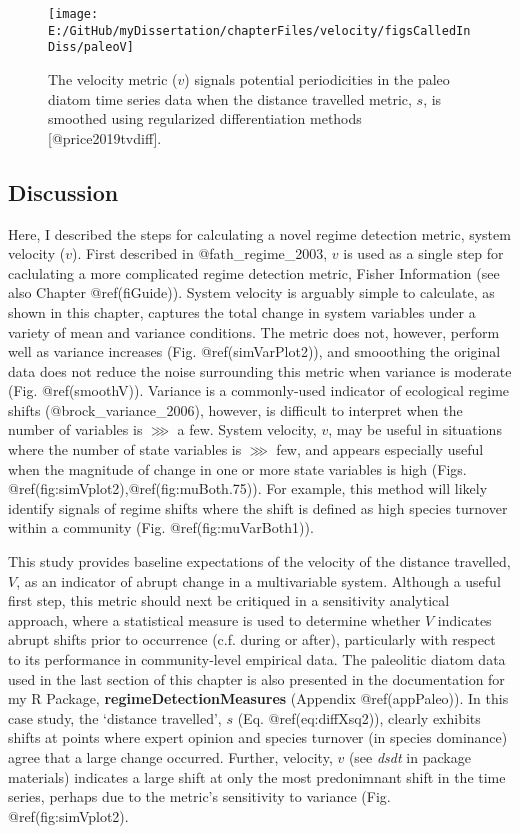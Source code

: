 \documentclass[]{article}
\begin{document}
\begin{figure}

{\centering \texttt{[image: E:/GitHub/myDissertation/chapterFiles/velocity/figsCalledInDiss/paleoV]} 

}

\caption{The velocity metric  ($v$) signals potential periodicities in the paleo diatom time series data when the distance travelled metric, $s$, is smoothed using regularized differentiation methods [@price2019tvdiff].}\label{fig:paleoV}
\end{figure}

\hypertarget{discussion}{%
\subsection{Discussion}\label{discussion}}

Here, I described the steps for calculating a novel regime detection
metric, system velocity (\(v\)). First described in @fath\_regime\_2003,
\(v\) is used as a single step for caclulating a more complicated regime
detection metric, Fisher Information (see also Chapter @ref(fiGuide)).
System velocity is arguably simple to calculate, as shown in this
chapter, captures the total change in system variables under a variety
of mean and variance conditions. The metric does not, however, perform
well as variance increases (Fig. @ref(simVarPlot2)), and smooothing the
original data does not reduce the noise surrounding this metric when
variance is moderate (Fig. @ref(smoothV)). Variance is a commonly-used
indicator of ecological regime shifts (@brock\_variance\_2006), however,
is difficult to interpret when the number of variables is \(\ggg\) a
few. System velocity, \(v\), may be useful in situations where the
number of state variables is \(\ggg\) few, and appears especially useful
when the magnitude of change in one or more state variables is high
(Figs. @ref(fig:simVplot2),@ref(fig:muBoth.75)). For example, this
method will likely identify signals of regime shifts where the shift is
defined as high species turnover within a community (Fig.
@ref(fig:muVarBoth1)).

This study provides baseline expectations of the velocity of the
distance travelled, \(V\), as an indicator of abrupt change in a
multivariable system. Although a useful first step, this metric should
next be critiqued in a sensitivity analytical approach, where a
statistical measure is used to determine whether \(V\) indicates abrupt
shifts prior to occurrence (c.f. during or after), particularly with
respect to its performance in community-level empirical data. The
paleolitic diatom data used in the last section of this chapter is also
presented in the documentation for my R Package,
\textbf{regimeDetectionMeasures} (Appendix @ref(appPaleo)). In this case
study, the `distance travelled', \(s\) (Eq. @ref(eq:diffXsq2)), clearly
exhibits shifts at points where expert opinion and species turnover (in
species dominance) agree that a large change occurred. Further,
velocity, \(v\) (see \emph{dsdt} in package materials) indicates a large
shift at only the most predonimnant shift in the time series, perhaps
due to the metric's sensitivity to variance (Fig. @ref(fig:simVplot2).
\end{document}

